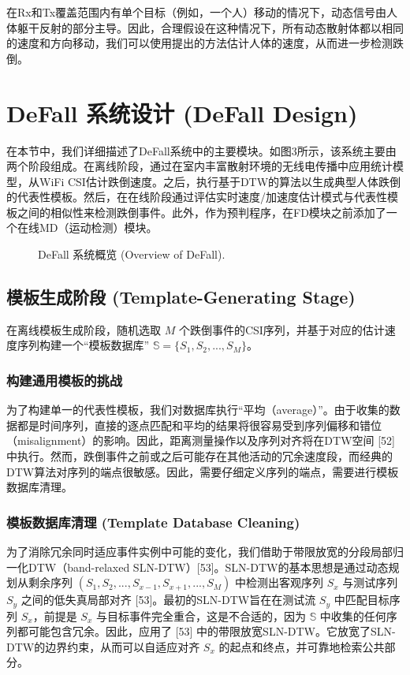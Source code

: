 \documentclass[journal]{IEEEtran}
\begin{document}
在Rx和Tx覆盖范围内有单个目标（例如，一个人）移动的情况下，动态信号由人体躯干反射的部分主导。因此，合理假设在这种情况下，所有动态散射体都以相同的速度和方向移动，我们可以使用提出的方法估计人体的速度，从而进一步检测跌倒。

\section{DeFall 系统设计 (DeFall Design)}
在本节中，我们详细描述了DeFall系统中的主要模块。如图3所示，该系统主要由两个阶段组成。在离线阶段，通过在室内丰富散射环境的无线电传播中应用统计模型，从WiFi CSI估计跌倒速度。之后，执行基于DTW的算法以生成典型人体跌倒的代表性模板。然后，在在线阶段通过评估实时速度/加速度估计模式与代表性模板之间的相似性来检测跌倒事件。此外，作为预判程序，在FD模块之前添加了一个在线MD（运动检测）模块。

\begin{figure}[htbp]
\centering
\vspace{6cm} %
\caption{DeFall 系统概览 (Overview of DeFall).}
\end{figure}

\subsection{模板生成阶段 (Template-Generating Stage)}
在离线模板生成阶段，随机选取 $M$ 个跌倒事件的CSI序列，并基于对应的估计速度序列构建一个“模板数据库” $\mathbb{S}=\{S_{1},S_{2},...,S_{M}\}$。

\subsubsection{构建通用模板的挑战}
为了构建单一的代表性模板，我们对数据库执行“平均（average）”。由于收集的数据都是时间序列，直接的逐点匹配和平均的结果将很容易受到序列偏移和错位（misalignment）的影响。因此，距离测量操作以及序列对齐将在DTW空间 [52] 中执行。然而，跌倒事件之前或之后可能存在其他活动的冗余速度段，而经典的DTW算法对序列的端点很敏感。因此，需要仔细定义序列的端点，需要进行模板数据库清理。

\subsubsection{模板数据库清理 (Template Database Cleaning)}
为了消除冗余同时适应事件实例中可能的变化，我们借助于带限放宽的分段局部归一化DTW（band-relaxed SLN-DTW）[53]。SLN-DTW的基本思想是通过动态规划从剩余序列 $(S_{1}, S_{2}, ..., S_{x-1}, S_{x+1}, ..., S_{M})$ 中检测出客观序列 $S_{x}$ 与测试序列 $S_{y}$ 之间的低失真局部对齐 [53]。最初的SLN-DTW旨在在测试流 $S_{y}$ 中匹配目标序列 $S_{x}$，前提是 $S_{x}$ 与目标事件完全重合，这是不合适的，因为 $\mathbb{S}$ 中收集的任何序列都可能包含冗余。因此，应用了 [53] 中的带限放宽SLN-DTW。它放宽了SLN-DTW的边界约束，从而可以自适应对齐 $S_{x}$ 的起点和终点，并可靠地检索公共部分。
\end{document}
